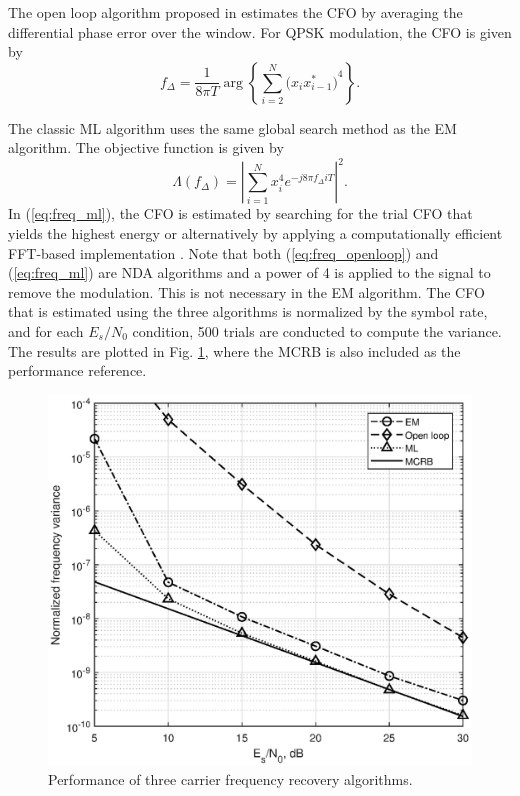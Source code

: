 \documentclass[journal,comsoc]{IEEEtran}
\begin{document}
The open loop algorithm proposed in \cite{Chuang1991} estimates the CFO  by averaging the differential phase error over the window.
For QPSK modulation, the CFO is given by \cite{mengali1997synchronization}
\begin{equation}
f_\Delta = \frac{1}{8 \pi T} \arg \left\{ {\sum\limits_{i = 2}^{{N} } {{{\big( {x_i x^*_{i-1}} \big)}^4}} } \right\}.
\label{eq:freq_openloop}
\end{equation}

The classic ML algorithm uses the same global search method as the EM algorithm.
The objective function is given by 
\begin{equation}
\Lambda (f_\Delta)=\left| \sum\limits_{i = 1}^N {{{ {{x^4_i}e^{-j8\pi f_\Delta i T}}}}} \right|^2. 
\label{eq:freq_ml}
\end{equation}
In (\ref{eq:freq_ml}), the CFO is estimated by searching for the trial CFO that yields the highest energy or alternatively by applying a computationally efficient FFT-based implementation \cite{Wang2004}.
Note that both (\ref{eq:freq_openloop}) and (\ref{eq:freq_ml}) are NDA algorithms and a power of 4 is applied to the signal to remove the modulation.
This is not necessary in the EM algorithm.
The CFO that is estimated using the three algorithms is normalized by the symbol rate,
and for each \(E_s/N_0\) condition, 500 trials are conducted to compute the variance.
The results are plotted in Fig. \ref{fig:per_freq}, where the MCRB is also included as the performance reference.

\begin{figure}[ht]
\centering
\includegraphics[width=3 in]{pic/per_freq-k.eps}
\caption{Performance of three carrier frequency recovery algorithms.}
\label{fig:per_freq} 
\end{figure} 
\end{document}

